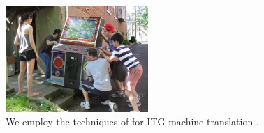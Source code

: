 \documentclass[10pt]{sigplanconf}
\begin{document}
\begin{figure}[h]
	\begin{center}
	\includegraphics[width=0.48\textwidth]{machine-translation.jpg}
	\end{center}
	\caption{We employ the techniques of \cite{deltax} for ITG machine translation \cite{itg-translation1,itg-translation2}.} %
	\label{fig:machine-translation}
\end{figure}


\end{document}
